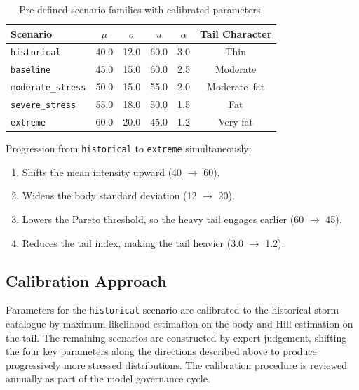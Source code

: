 \documentclass[11pt,a4paper]{article}
\begin{document}
\begin{table}[H]
    \centering
    \caption{Pre-defined scenario families with calibrated parameters.}
    \label{tab:scenarios}
    \begin{tabular}{lccccc}
        \toprule
        \textbf{Scenario} & $\mu$ & $\sigma$ & $u$ & $\alpha$ & \textbf{Tail Character} \\
        \midrule
        \texttt{historical}       & 40.0 & 12.0 & 60.0 & 3.0 & Thin \\
        \texttt{baseline}         & 45.0 & 15.0 & 60.0 & 2.5 & Moderate \\
        \texttt{moderate\_stress}  & 50.0 & 15.0 & 55.0 & 2.0 & Moderate--fat \\
        \texttt{severe\_stress}    & 55.0 & 18.0 & 50.0 & 1.5 & Fat \\
        \texttt{extreme}          & 60.0 & 20.0 & 45.0 & 1.2 & Very fat \\
        \bottomrule
    \end{tabular}
\end{table}

\noindent Progression from \texttt{historical} to \texttt{extreme} simultaneously:
\begin{enumerate}[nosep]
    \item Shifts the mean intensity upward (40 $\to$ 60).
    \item Widens the body standard deviation (12 $\to$ 20).
    \item Lowers the Pareto threshold, so the heavy tail engages earlier
          (60 $\to$ 45).
    \item Reduces the tail index, making the tail heavier (3.0 $\to$ 1.2).
\end{enumerate}

\subsection{Calibration Approach}

Parameters for the \texttt{historical} scenario are calibrated to the historical
storm catalogue by maximum likelihood estimation on the body and Hill estimation
on the tail. The remaining scenarios are constructed by expert judgement, shifting
the four key parameters along the directions described above to produce progressively
more stressed distributions. The calibration procedure is reviewed annually as
part of the model governance cycle.

\mkmimplementation
\end{document}
